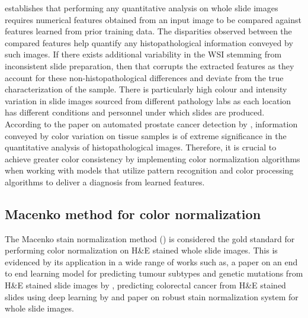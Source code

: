 \documentclass{l4proj}
\begin{document}
\cite{li2015complete} establishes that performing any quantitative analysis on whole slide images requires numerical features obtained from an input image to be compared against features learned from prior training data. The disparities observed between the compared features help quantify any histopathological information conveyed by such images. If there exists additional variability in the WSI stemming from inconsistent slide preparation, then that corrupts the extracted features as they account for these non-histopathological differences and deviate from the true characterization of the sample. There is particularly high colour and intensity variation in slide images sourced from different pathology labs as each location has different conditions and personnel under which slides are produced. According to the paper on automated prostate cancer detection by \cite{gorelick2013prostate}, information conveyed by color variation on tissue samples is of extreme significance in the quantitative analysis of histopathological images. Therefore, it is crucial to achieve greater color consistency by implementing color normalization algorithms when working with models that utilize pattern recognition and color processing algorithms to deliver a diagnosis from learned features. 
\\

\subsection{Macenko method for color normalization}
The Macenko stain normalization method (\cite{macenko2009method}) is considered the gold standard for performing color normalization on H\&E stained whole slide images. This is evidenced by its application in a wide range of works such as, a paper on an end to end learning model for predicting tumour subtypes and genetic mutations from H\&E stained slide images by \cite{van2021deepmed}, predicting colorectal cancer from H\&E stained slides using deep learning by \cite{Kather2019} and \cite{anghel2019high} paper on robust stain normalization system for whole slide images. 
\end{document}
